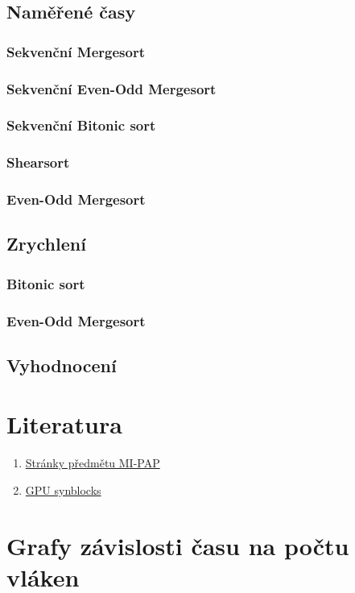 \documentclass[12pt]{article}
\begin{document}
\subsection{Naměřené časy}

\subsubsection{Sekvenční Mergesort}

\subsubsection{Sekvenční Even-Odd Mergesort}


\subsubsection{Sekvenční Bitonic sort}

\subsubsection{Shearsort}


\subsubsection{Even-Odd Mergesort}

\subsection{Zrychlení}

\subsubsection{Bitonic sort}
\subsubsection{Even-Odd Mergesort}

\subsection{Vyhodnocení}
\section{Literatura}
\begin{enumerate}
\item \href{https://edux.fit.cvut.cz/courses/MI-PAP}{Stránky předmětu MI-PAP}
\item \href{http://aggregate.org/MAGIC/#GPU SyncBlocks}{\label{cud:synblocks}GPU synblocks}
\end{enumerate}


\appendix
\section{Grafy závislosti času na počtu vláken}
\end{document}
